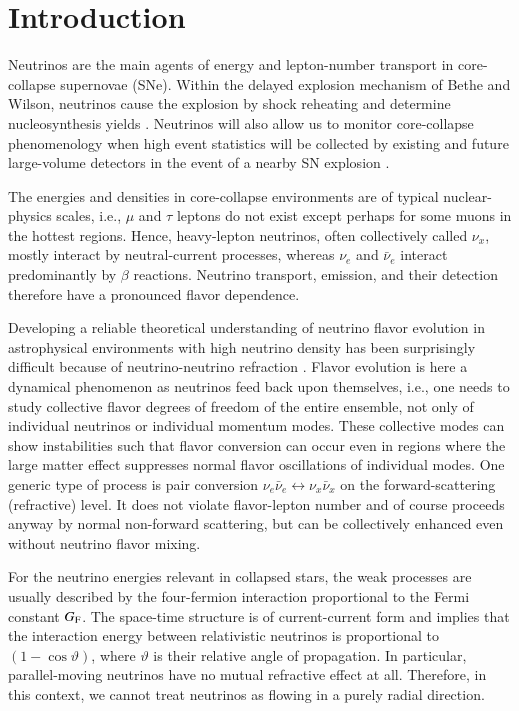 \documentclass[iop,twocolappendix,numberedappendix]{emulateapj}
\begin{document}
\section{Introduction}

Neutrinos are the main agents of energy and lepton-number transport in
core-collapse supernovae (SNe). Within the delayed explosion mechanism of
Bethe and Wilson, neutrinos cause the explosion by shock reheating and
determine nucleosynthesis yields \citep{Janka:2012wk,Burrows:2012ew}.
Neutrinos  will also allow us to monitor core-collapse phenomenology when
high event statistics will be collected by existing and future large-volume
detectors  in the event of a nearby SN explosion \citep{Scholberg:2012id}.

The energies and densities in core-collapse environments are of typical
nuclear-physics scales, i.e., $\mu$ and $\tau$ leptons do not exist except
perhaps for some muons in the hottest regions. Hence, heavy-lepton neutrinos,
often collectively called $\nu_x$, mostly interact by neutral-current
processes, whereas $\nu_e$ and $\bar\nu_e$ interact predominantly by $\beta$
reactions. Neutrino transport, emission, and their detection therefore have a
pronounced flavor dependence.

Developing a reliable theoretical understanding of neutrino flavor evolution
in astrophysical environments with high neutrino density has been
surprisingly difficult because of neutrino-neutrino refraction
\citep{Duan:2006an,Duan:2010bg,Mirizzi:2015eza,Chakraborty:2016yeg}. Flavor
evolution is here a dynamical phenomenon as neutrinos feed back upon
themselves, i.e., one needs to study collective flavor degrees of freedom of
the entire ensemble, not only of individual neutrinos or individual momentum
modes. These collective modes can show instabilities such that flavor
conversion can occur even in regions where the large matter effect suppresses
normal flavor oscillations of individual modes. One generic type of process
is pair conversion $\nu_e\bar\nu_e\leftrightarrow\nu_x\bar\nu_x$ on the
forward-scattering (refractive) level. It does not violate flavor-lepton
number and of course proceeds anyway by normal non-forward scattering, but
can be collectively enhanced even without neutrino flavor mixing.

For the neutrino energies relevant in collapsed stars, the weak processes are
usually described by the four-fermion interaction proportional to the Fermi
constant $G_{\rm F}$. The space-time structure is of current-current form and
implies that the interaction energy between relativistic neutrinos is
proportional to $(1-\cos\vartheta)$, where $\vartheta$ is their relative angle of
propagation. In particular, parallel-moving neutrinos have no mutual
refractive effect at all. Therefore, in this context, we cannot treat
neutrinos as flowing in a purely radial direction.
\end{document}
